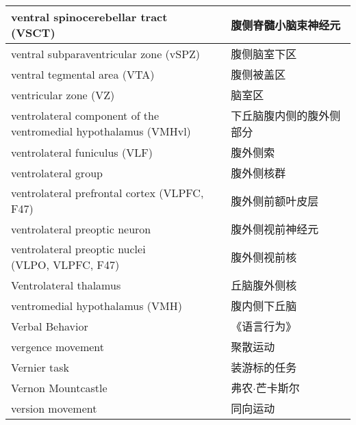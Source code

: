 \begin{longtable}{lll}
	\midrule
	ventral spinocerebellar tract (VSCT)   && 腹侧脊髓小脑束神经元  \\
	
	\midrule
	ventral subparaventricular zone (vSPZ)  && 腹侧脑室下区  \\
	
	\midrule
	ventral tegmental area (VTA)   && 腹侧被盖区  \\
	
	\midrule
	ventricular zone (VZ)   && 脑室区  \\
	
	\midrule
	\makecell[l]{ventrolateral component of the \\ventromedial hypothalamus (VMHvl)}  && 下丘脑腹内侧的腹外侧部分  \\
	
	\midrule
	ventrolateral funiculus (VLF)   && 腹外侧索  \\
	
	\midrule
	ventrolateral group   && 腹外侧核群  \\
	
	\midrule
	ventrolateral prefrontal cortex (VLPFC, F47)   && 腹外侧前额叶皮层  \\
	
	\midrule
	ventrolateral preoptic neuron   && 腹外侧视前神经元  \\
	
	\midrule
	\makecell[l]{ventrolateral preoptic nuclei\\ (VLPO, VLPFC, F47)}  && 腹外侧视前核  \\
	
	\midrule
	Ventrolateral thalamus   && 丘脑腹外侧核  \\
	
	\midrule
	ventromedial hypothalamus (VMH)  && 腹内侧下丘脑  \\
	
	\midrule
	Verbal Behavior   && 《语言行为》  \\
	
	\midrule
	vergence movement   && 聚散运动  \\
	
	\midrule
	Vernier task   && 装游标的任务  \\
	
	\midrule
	Vernon Mountcastle   && 弗农$\cdot$芒卡斯尔  \\
	
	\midrule
	version movement   && 同向运动  \\
	

\end{longtable}
